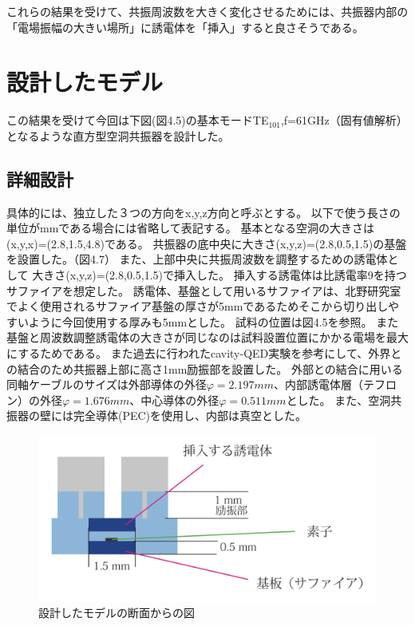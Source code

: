 これらの結果を受けて、共振周波数を大きく変化させるためには、共振器内部の「電場振幅の大きい場所」に誘電体を「挿入」すると良さそうである。

\section{設計したモデル}
この結果を受けて今回は下図(図4.5)の基本モードTE$_{101}$,f=61GHz（固有値解析）となるような直方型空洞共振器を設計した。

\subsection{詳細設計}
具体的には、独立した３つの方向をx,y,z方向と呼ぶとする。
以下で使う長さの単位がmmである場合には省略して表記する。
基本となる空洞の大きさは(x,y,x)=(2.8,1.5,4.8)である。
共振器の底中央に大きさ(x,y,z)=(2.8,0.5,1.5)の基盤を設置した。（図4.7）
また、上部中央に共振周波数を調整するための誘電体として
大きさ(x,y,z)=(2.8,0.5,1.5)で挿入した。
挿入する誘電体は比誘電率9を持つサファイアを想定した。
誘電体、基盤として用いるサファイアは、北野研究室でよく使用されるサファイア基盤の厚さが5mmであるためそこから切り出しやすいように今回使用する厚みも5mmとした。
試料の位置は図4.5を参照。
また基盤と周波数調整誘電体の大きさが同じなのは試料設置位置にかかる電場を最大にするためである。
また過去に行われたcavity-QED実験\cite{cQED}を参考にして、外界との結合のため共振器上部に高さ1mm励振部を設置した。
外部との結合に用いる同軸ケーブルのサイズは外部導体の外径$φ=2.197mm$、内部誘電体層（テフロン）の外径$φ=1.676mm$、中心導体の外径$φ=0.511mm$とした。
また、空洞共振器の壁には完全導体(PEC)を使用し、内部は真空とした。

\vspace{10 mm}

\begin{figure}[h]
  \begin{center}
    \includegraphics[width=12cm]{./image/newmodel.png}
    \caption{設計したモデルの断面からの図}
    \label{fig:Cavity}
  \end{center}
\end{figure}

